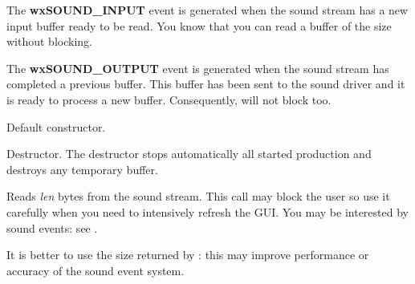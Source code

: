 The {\bf wxSOUND\_INPUT} event is generated when the sound stream has a new input
buffer ready to be read. You know that you can read a buffer of the size
 without blocking. 

The {\bf wxSOUND\_OUTPUT} event is generated when the sound stream has completed a
previous buffer. This buffer has been sent to the sound driver and it is ready to
process a new buffer. Consequently,  will not
block too.



\label{wxsoundstreamwxsoundstream}


Default constructor.

\label{wxsoundstreamdtor}


Destructor. The destructor stops automatically all started production and destroys
any temporary buffer.


\label{wxsoundstreamread}


Reads {\it len} bytes from the sound stream. This call may block the user so
use it carefully when you need to intensively refresh the GUI. You may be
interested by sound events: see . 

It is better to use the size returned by : this may improve performance or accuracy of the
sound event system.




